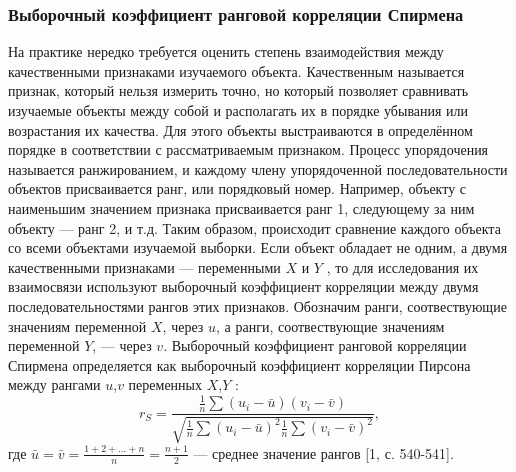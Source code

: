 \documentclass[a4paper]{article}
\begin{document}
            \subsubsection{Выборочный коэффициент ранговой корреляции Спирмена}
                \noindent На практике нередко требуется оценить степень взаимодействия между качественными признаками изучаемого объекта. Качественным называется признак, который нельзя измерить точно, но который позволяет сравнивать изучаемые объекты между собой и располагать их в порядке убывания или возрастания их качества. Для этого объекты выстраиваются в определённом порядке в соответствии с рассматриваемым признаком. Процесс упорядочения называется ранжированием, и каждому члену упорядоченной последовательности объектов присваивается ранг, или порядковый номер. Например, объекту с наименьшим значением признака присваивается ранг 1, следующему за ним объекту — ранг 2, и т.д. Таким образом, происходит сравнение каждого объекта со всеми объектами изучаемой выборки.
                \newline
                Если объект обладает не одним, а двумя качественными признаками — переменными $X$ и $Y$ , то для исследования их взаимосвязи используют выборочный коэффициент корреляции между двумя последовательностями рангов этих признаков.
                \newline
                Обозначим ранги, соотвествующие значениям переменной $X$, через $u$, а ранги, соотвествующие значениям переменной $Y$, — через $v$.
                \newline
                Выборочный коэффициент ранговой корреляции Спирмена определяется как выборочный коэффициент корреляции Пирсона между рангами $u$,$v$ переменных $X$,$Y$ :
                \begin{equation}
                r_{S} = \frac{
                    \frac{1}{n}\sum{(u_{i} - \bar{u})(v_{i}-\bar{v})}
                }{
                    \sqrt{\frac{1}{n}\sum{(u_{i} - \bar{u})^{2}}\frac{1}{n}\sum{(v_{i} - \bar{v})^{2}}}
                },
                \label{rS}
                \end{equation}
                где $\bar{u} = \bar{v} = \frac{1 + 2 + ... + n}{n} = \frac{n + 1}{2}$ — среднее значение рангов [1, с. 540-541].
\end{document}
